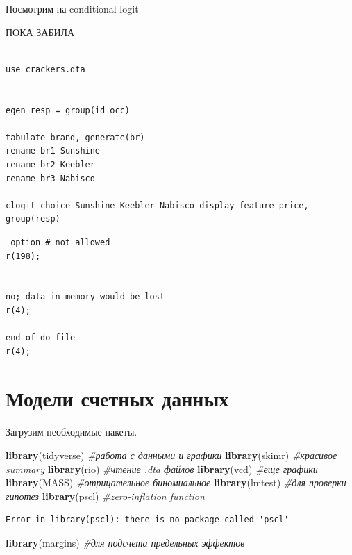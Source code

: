 \documentclass[]{book}
\newenvironment{Shaded}{\begin{snugshade}}{\end{snugshade}}
\newcommand{\CommentTok}[1]{\textcolor[rgb]{0.56,0.35,0.01}{\textit{#1}}}
\newcommand{\KeywordTok}[1]{\textcolor[rgb]{0.13,0.29,0.53}{\textbf{#1}}}
\newcommand{\NormalTok}[1]{#1}
\begin{document}
Посмотрим на conditional logit

ПОКА ЗАБИЛА

\begin{verbatim}

use crackers.dta


egen resp = group(id occ)

tabulate brand, generate(br)
rename br1 Sunshine
rename br2 Keebler
rename br3 Nabisco

clogit choice Sunshine Keebler Nabisco display feature price, group(resp)
\end{verbatim}

\begin{verbatim}
 option # not allowed
r(198);


no; data in memory would be lost
r(4);

end of do-file
r(4);
\end{verbatim}

\hypertarget{poisreg}{%
\chapter{Модели счетных данных}\label{poisreg}}

Загрузим необходимые пакеты.

\begin{Shaded}
\begin{Highlighting}[]
\KeywordTok{library}\NormalTok{(tidyverse) }\CommentTok{#работа с данными и графики}
\KeywordTok{library}\NormalTok{(skimr) }\CommentTok{#красивое summary}
\KeywordTok{library}\NormalTok{(rio) }\CommentTok{#чтение .dta файлов}
\KeywordTok{library}\NormalTok{(vcd) }\CommentTok{#еще графики}
\KeywordTok{library}\NormalTok{(MASS) }\CommentTok{#отрицательное биномиальное}
\KeywordTok{library}\NormalTok{(lmtest) }\CommentTok{#для проверки гипотез}
\KeywordTok{library}\NormalTok{(pscl) }\CommentTok{#zero-inflation function}
\end{Highlighting}
\end{Shaded}

\begin{verbatim}
Error in library(pscl): there is no package called 'pscl'
\end{verbatim}

\begin{Shaded}
\begin{Highlighting}[]
\KeywordTok{library}\NormalTok{(margins) }\CommentTok{#для подсчета предельных эффектов}
\end{Highlighting}
\end{Shaded}
\end{document}
